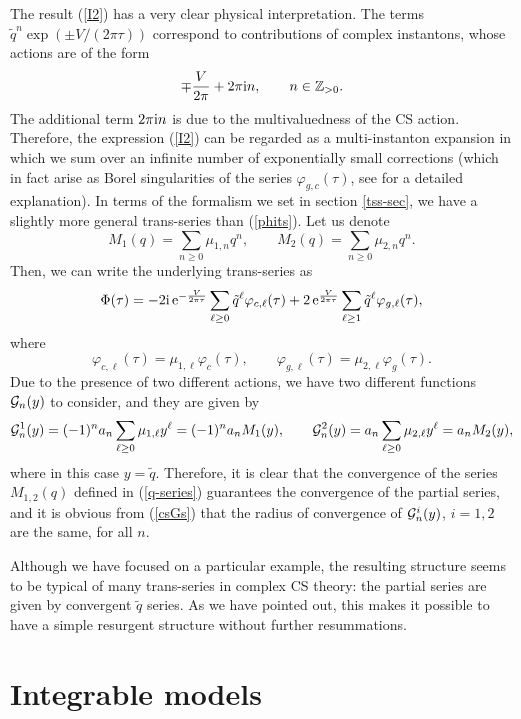 \documentclass[a4paper,11pt]{article}
\theoremstyle{definition}
\newcommand{\CG}{{\cal G}}
\def\IZ{{\mathbb Z}}
\newcommand{\re}{{\rm e}}
\newcommand{\ri}{{\rm i}}
\newcommand{\be}{\begin{equation}}
\newcommand{\ee}{\end{equation}}
\begin{document}
The result (\ref{I2}) has a very clear physical interpretation. The terms 
$\tilde q^n \exp(\pm V/(2 \pi \tau))$ correspond to contributions of 
complex instantons, whose actions are of the form 
%
\be
\mp {V \over 2 \pi}+ 2 \pi \ri n, \qquad n \in \IZ_{>0}. 
\ee
%
The additional term $2 \pi \ri n$ is due to the multivaluedness of the CS action. Therefore, the expression (\ref{I2}) can be 
regarded as a multi-instanton expansion in which we sum over an infinite 
number of exponentially small corrections (which in fact arise as Borel 
singularities of the series $\varphi_{g,c}(\tau)$, see \cite{ggm1} for a detailed explanation). In terms of the formalism we 
set in section \ref{tss-sec}, we have a slightly more general trans-series than (\ref{phits}). Let us denote 
%
\be
\label{q-series}
M_1( q)= \sum_{n \ge 0} \mu_{1, n}  q^n, \qquad M_2( q)= \sum_{n \ge 0} \mu_{2, n}  q^n. 
\ee
%
Then, we can write the underlying trans-series as 
%
\be
\Phi(\tau)=  -2 \ri \, \re^{-{V \over 2 \pi \tau}} \sum_{\ell \ge 0} \tilde q^\ell  \varphi_{c, \ell} (\tau) + 2 \, \re^{{V \over 2 \pi \tau}}\sum_{\ell \ge 1} \tilde q^\ell  \varphi_{g, \ell}(\tau), 
\ee
%
where 
%
\be
\varphi_{c, \ell} (\tau)= \mu_{1, \ell} \varphi_{c} (\tau), \qquad \varphi_{g, \ell} (\tau)=\mu_{2, \ell} \varphi_{g} (\tau). 
\ee
%
Due to the presence of two different actions, we have two different functions $\CG_n(y)$ to consider, and they are given by 
%
\be
\label{csGs}
\CG_n^1(y)= (-1)^n a_n \sum_{\ell \ge 0} \mu_{1, \ell} y^\ell= (-1)^n a_n M_1(y), \qquad \CG_n^2 (y)=  a_n \sum_{\ell \ge 0} \mu_{2, \ell} y^\ell=a_n M_2(y),  
\ee
%
where in this case $y= \tilde q$. 
Therefore, it is clear that the convergence of the series $M_{1,2}(q)$ defined in (\ref{q-series}) 
guarantees the convergence of the partial series, and 
it is obvious from (\ref{csGs}) that the radius of convergence of $\CG^i_n(y)$, $i=1,2$ are the same, for all $n$. 

Although we have focused on a particular example, the resulting structure seems to be typical of many trans-series in complex CS theory:
the partial series are given by convergent $\tilde q$ series. As we have pointed out, this makes it possible to have a simple resurgent structure without further resummations. 



\section{Integrable models}
\label{sec-integrable}
\end{document}
